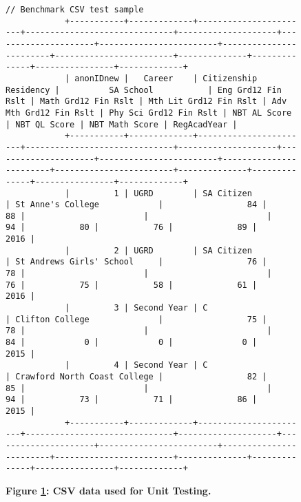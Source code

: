 \begin{figure}[H]
\begin{mdframed}[rightline=false,leftline=false]
\begin{BVerbatim}[fontsize=\tiny]
            // Benchmark CSV test sample
            +-----------+-------------+-----------------------+------------------------------+--------------------+---------------------+------------------------+------------------------+------------------------+--------------+--------------+----------------+-------------+
            | anonIDnew |   Career    | Citizenship Residency |          SA School           | Eng Grd12 Fin Rslt | Math Grd12 Fin Rslt | Mth Lit Grd12 Fin Rslt | Adv Mth Grd12 Fin Rslt | Phy Sci Grd12 Fin Rslt | NBT AL Score | NBT QL Score | NBT Math Score | RegAcadYear |
            +-----------+-------------+-----------------------+------------------------------+--------------------+---------------------+------------------------+------------------------+------------------------+--------------+--------------+----------------+-------------+
            |         1 | UGRD        | SA Citizen            | St Anne's College            |                 84 |                  88 |                        |                        |                     94 |           80 |           76 |             89 |        2016 |
            |         2 | UGRD        | SA Citizen            | St Andrews Girls' School     |                 76 |                  78 |                        |                        |                     76 |           75 |           58 |             61 |        2016 |
            |         3 | Second Year | C                     | Clifton College              |                 75 |                  78 |                        |                        |                     84 |            0 |            0 |              0 |        2015 |
            |         4 | Second Year | C                     | Crawford North Coast College |                 82 |                  85 |                        |                        |                     94 |           73 |           71 |             86 |        2015 |
            +-----------+-------------+-----------------------+------------------------------+--------------------+---------------------+------------------------+------------------------+------------------------+--------------+--------------+----------------+-------------+

        \end{BVerbatim}
    \end{mdframed}
    \caption[CSVs for Unit Testing]{\textbf{Figure \ref{fig-sample-csv-files}: CSV data used for Unit Testing.}}
    \label{fig-sample-csv-files}
\end{figure}
